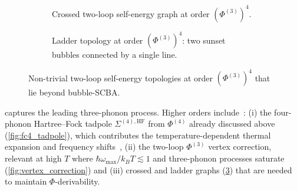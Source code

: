 \begin{figure}[ht]
\centering
\begin{subfigure}[b]{0.95\linewidth}
\centering
{}
\caption{Crossed two-loop self-energy graph at order
$(\Phi^{(3)})^4$.}
\label{fig:crossed_graph}
\end{subfigure}

\vspace{1em}
\begin{subfigure}[b]{0.95\linewidth}
\centering
{}
\caption{Ladder topology at order $(\Phi^{(3)})^4$:
two sunset bubbles connected by a single line.}
\label{fig:ladder_graph}
\end{subfigure}

\caption{Non-trivial two-loop self-energy topologies at order
$(\Phi^{(3)})^4$ that lie beyond bubble-SCBA.}
\label{fig:two_loop_topologies}
\end{figure}

 captures the leading three-phonon process. Higher
orders include~\cite{wang_nonequilibrium_2014,guo_quantum_2020}:
(i) the four-phonon Hartree--Fock tadpole
$\Sigma^{(4),\mathrm{HF}}$ from $\Phi^{(4)}$ already discussed above
(\cref{fig:fc4_tadpole}), which contributes the
temperature-dependent thermal expansion and frequency
shifts~\cite{wang_nonequilibrium_2014},
(ii) the two-loop $\Phi^{(3)}$ vertex correction, relevant at high
$T$ where $\hbar\omega_{\max}/k_B T \lesssim 1$ and three-phonon
processes saturate (\cref{fig:vertex_correction}) and
(iii) crossed and ladder graphs (\cref{fig:two_loop_topologies}) that are needed
to maintain $\Phi$-derivability.

